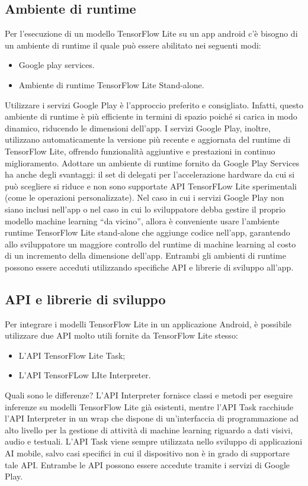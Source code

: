 \subsection{Ambiente di runtime}
Per l’esecuzione di un modello TensorFlow Lite su un app android c’è bisogno di un ambiente di runtime il quale può essere abilitato nei seguenti modi:
\begin{itemize}
    \item Google play services.
    \item Ambiente di runtime TensorFlow Lite Stand-alone.
\end{itemize}
Utilizzare i servizi Google Play è l’approccio preferito e consigliato. Infatti, questo ambiente di runtime è più efficiente in termini di spazio poiché si carica in modo dinamico, riducendo le dimensioni dell’app.
I servizi Google Play, inoltre, utilizzano automaticamente la versione più recente e aggiornata del runtime di TensorFlow Lite, offrendo funzionalità aggiuntive e prestazioni in continuo miglioramento. 
Adottare un ambiente di runtime fornito da Google Play Services ha anche degli svantaggi: il set di delegati per l’accelerazione hardware da cui si può scegliere si riduce e non sono supportate API TensorFLow Lite sperimentali
(come le operazioni personalizzate). Nel caso in cui i servizi Google Play non siano inclusi nell’app o nel caso in cui lo sviluppatore debba gestire il proprio modello machine learning “da vicino”, allora è conveniente usare
l’ambiente runtime TensorFlow Lite stand-alone che aggiunge codice nell’app, garantendo allo sviluppatore un maggiore controllo del runtime di machine learning al costo di un incremento della dimensione dell’app. 
Entrambi gli ambienti di runtime possono essere acceduti utilizzando specifiche API e librerie di sviluppo all’app.

\subsection{API e librerie di sviluppo}
Per integrare i modelli TensorFlow Lite in un applicazione Android, è possibile utilizzare due API molto utili fornite da TensorFlow Lite stesso:
\begin{itemize}
    \item L’API TensorFlow Lite Task;
    \item L’API TensorFLow LIte Interpreter.
\end{itemize}
Quali sono le differenze? L’API Interpreter fornisce classi e metodi per eseguire inferenze su modelli TensorFlow Lite già esistenti, mentre l’API Task racchiude l’API Interpreter in un wrap che dispone di un’interfaccia
di programmazione ad alto livello per la gestione di attività di machine learning riguardo a dati visivi, audio e testuali. L’API Task viene sempre utilizzata nello sviluppo di applicazioni AI mobile, salvo casi specifici
in cui il dispositivo non è in grado di supportare tale API. Entrambe le API possono essere accedute tramite i servizi di Google Play.

